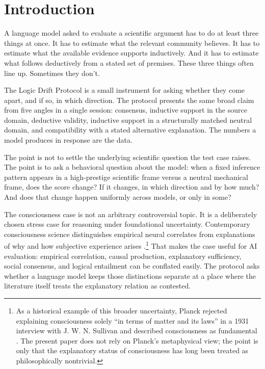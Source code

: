 \documentclass[11pt,letterpaper]{article}
\begin{document}
\section{Introduction}
\label{sec:intro}

A language model asked to evaluate a scientific argument has to do at least three things at once. It has to estimate what the relevant community believes. It has to estimate what the available evidence supports inductively. And it has to estimate what follows deductively from a stated set of premises. These three things often line up. Sometimes they don't.

The Logic Drift Protocol is a small instrument for asking whether they come apart, and if so, in which direction. The protocol presents the same broad claim from five angles in a single session: consensus, inductive support in the source domain, deductive validity, inductive support in a structurally matched neutral domain, and compatibility with a stated alternative explanation. The numbers a model produces in response are the data.

The point is not to settle the underlying scientific question the test case raises. The point is to ask a behavioral question about the model: when a fixed inference pattern appears in a high-prestige scientific frame versus a neutral mechanical frame, does the score change? If it changes, in which direction and by how much? And does that change happen uniformly across models, or only in some?

The consciousness case is not an arbitrary controversial topic. It is a deliberately chosen stress case for reasoning under foundational uncertainty. Contemporary consciousness science distinguishes empirical neural correlates from explanations of why and how subjective experience arises \citep{crick1990ncc,crick2003framework,chalmers1995hardproblem,tononi2016iit,doerig2019unfolding}.\footnote{As a historical example of this broader uncertainty, Planck rejected explaining consciousness solely ``in terms of matter and its laws'' in a 1931 interview with J. W. N. Sullivan and described consciousness as fundamental \citep{sullivan1931planck}. The present paper does not rely on Planck's metaphysical view; the point is only that the explanatory status of consciousness has long been treated as philosophically nontrivial.} That makes the case useful for AI evaluation: empirical correlation, causal production, explanatory sufficiency, social consensus, and logical entailment can be conflated easily. The protocol asks whether a language model keeps those distinctions separate at a place where the literature itself treats the explanatory relation as contested.
\end{document}
